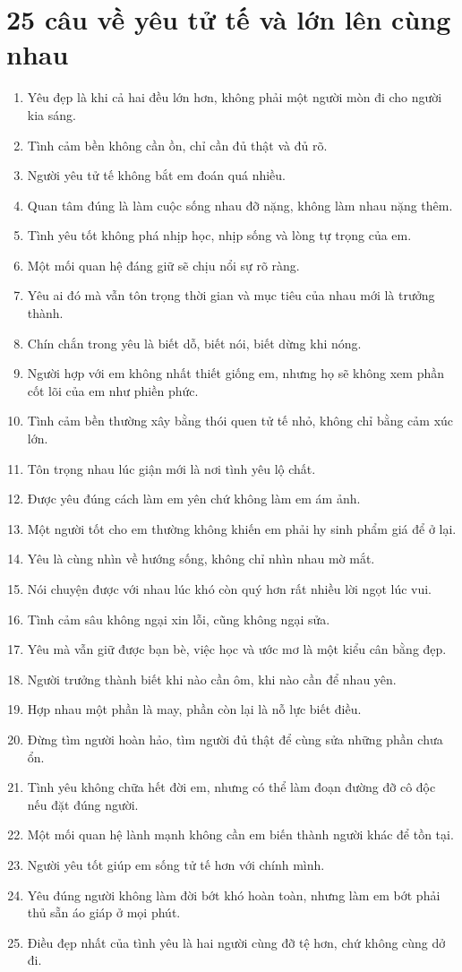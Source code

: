 \section{25 câu về yêu tử tế và lớn lên cùng nhau}
\begin{enumerate}[leftmargin=*,resume]
\item Yêu đẹp là khi cả hai đều lớn hơn, không phải một người mòn đi cho người kia sáng.
\item Tình cảm bền không cần ồn, chỉ cần đủ thật và đủ rõ.
\item Người yêu tử tế không bắt em đoán quá nhiều.
\item Quan tâm đúng là làm cuộc sống nhau đỡ nặng, không làm nhau nặng thêm.
\item Tình yêu tốt không phá nhịp học, nhịp sống và lòng tự trọng của em.
\item Một mối quan hệ đáng giữ sẽ chịu nổi sự rõ ràng.
\item Yêu ai đó mà vẫn tôn trọng thời gian và mục tiêu của nhau mới là trưởng thành.
\item Chín chắn trong yêu là biết dỗ, biết nói, biết dừng khi nóng.
\item Người hợp với em không nhất thiết giống em, nhưng họ sẽ không xem phần cốt lõi của em như phiền phức.
\item Tình cảm bền thường xây bằng thói quen tử tế nhỏ, không chỉ bằng cảm xúc lớn.
\item Tôn trọng nhau lúc giận mới là nơi tình yêu lộ chất.
\item Được yêu đúng cách làm em yên chứ không làm em ám ảnh.
\item Một người tốt cho em thường không khiến em phải hy sinh phẩm giá để ở lại.
\item Yêu là cùng nhìn về hướng sống, không chỉ nhìn nhau mờ mắt.
\item Nói chuyện được với nhau lúc khó còn quý hơn rất nhiều lời ngọt lúc vui.
\item Tình cảm sâu không ngại xin lỗi, cũng không ngại sửa.
\item Yêu mà vẫn giữ được bạn bè, việc học và ước mơ là một kiểu cân bằng đẹp.
\item Người trưởng thành biết khi nào cần ôm, khi nào cần để nhau yên.
\item Hợp nhau một phần là may, phần còn lại là nỗ lực biết điều.
\item Đừng tìm người hoàn hảo, tìm người đủ thật để cùng sửa những phần chưa ổn.
\item Tình yêu không chữa hết đời em, nhưng có thể làm đoạn đường đỡ cô độc nếu đặt đúng người.
\item Một mối quan hệ lành mạnh không cần em biến thành người khác để tồn tại.
\item Người yêu tốt giúp em sống tử tế hơn với chính mình.
\item Yêu đúng người không làm đời bớt khó hoàn toàn, nhưng làm em bớt phải thủ sẵn áo giáp ở mọi phút.
\item Điều đẹp nhất của tình yêu là hai người cùng đỡ tệ hơn, chứ không cùng dở đi.
\end{enumerate}

